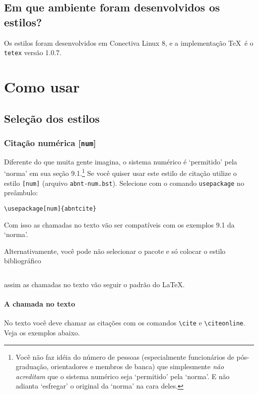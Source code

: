 \documentclass[espacosimples]{abnt}
\begin{document}
\section{Em que ambiente foram desenvolvidos os estilos?}

Os estilos foram desenvolvidos em Conectiva Linux 8, e a implementação \TeX\ é
o {\tt tetex} versão 1.0.7.

\chapter{Como usar}

\section{Seleção dos estilos}

\subsection{Citação numérica [{\tt num}]}

Diferente do que muita gente imagina, o sistema numérico é
`permitido'  pela `norma'\cite{NBR6023:2000} em sua seção
9.1.\footnote{Você não faz idéia do número de pessoas (especialmente
funcionários de pós-graduação, orientadores e membros de banca) que simplesmente
\emph{não acreditam} que o sistema numérico seja `permitido' pela `norma'.
E não adianta `esfregar' o original da `norma' na cara deles.}
Se você quiser usar este estilo de citação utilize o estilo {\tt [num]} (arquivo
{\tt abnt-num.bst}).
Selecione com o comando \verb+usepackage+ no preâmbulo:
\begin{verbatim}
\usepackage[num]{abntcite}
\end{verbatim}
Com isso as chamadas no texto vão ser
compatíveis com os exemplos 9.1 da `norma'\cite{NBR6023:2000}.

Alternativamente, você pode não selecionar o pacote e só colocar
o estilo bibliográfico
\begin{verbatim}

\end{verbatim}
assim as chamadas no texto vão seguir o padrão do \LaTeX.

\subsubsection{A chamada no texto}

No texto você deve chamar as citações com os comandos \verb+\cite+ e
\verb+\citeonline+. Veja os exemplos abaixo.
\end{document}
